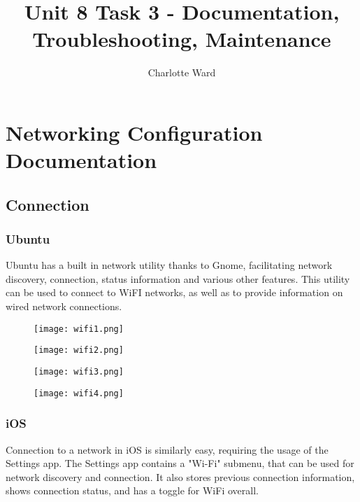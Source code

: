 \documentclass[11pt]{amsart}
\title{Unit 8 Task 3 - Documentation, Troubleshooting, Maintenance}
\author{Charlotte Ward}
\date{}
\begin{document}
\maketitle
\tableofcontents
\hypertarget{x-networking-configuration-documentation}{\section*{Networking Configuration Documentation}}
\hypertarget{x-connection}{\subsection*{Connection}}
\hypertarget{x-ubuntu}{\subsubsection*{Ubuntu}}
Ubuntu has a built in network utility thanks to Gnome, facilitating network discovery, connection, status information and various other features. This utility can be used to connect to WiFI networks, as well as to provide information on wired network connections.


\begin{figure}[h]{}
\centering\texttt{[image: wifi1.png]}
\caption{}

\end{figure}

\begin{figure}[h]{}
\centering\texttt{[image: wifi2.png]}
\caption{}

\end{figure}

\begin{figure}[h]{}
\centering\texttt{[image: wifi3.png]}
\caption{}

\end{figure}

\begin{figure}[h]{}
\centering\texttt{[image: wifi4.png]}
\caption{}

\end{figure}

\hypertarget{x-ios}{\subsubsection*{iOS}}
Connection to a network in iOS is similarly easy, requiring the usage of the Settings app. The Settings app contains a "Wi-Fi" submenu, that can be used for network discovery and connection. It also stores previous connection information, shows connection status, and has a toggle for WiFi overall.
\end{document}
